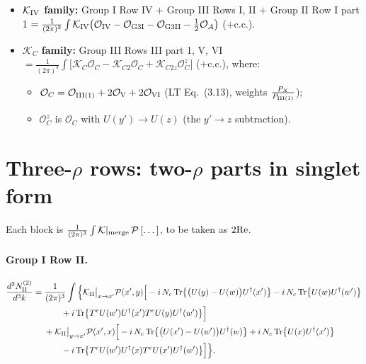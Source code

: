 \documentclass[10pt]{article}
\numberwithin{equation}{section}
\newcommand{\PP}{\mathcal P}
\newcommand{\Tr}{{\rm Tr}}
\newcommand{\Ud}{U^\dagger}
\newcommand{\OO}{\mathcal O}
\begin{document}
\begin{itemize}
\item \textbf{$\mathcal K_{\rm IV}$ family:} Group I Row IV $+$ Group III Rows I, II $+$ Group II Row I part 1 $=\frac{1}{(2\pi)^3}\int\mathcal K_{\rm IV}\big(\OO_{\rm IV}-\OO_{\rm G3I}-\OO_{\rm G3II}-\frac12\OO_{A}\big)$ ($+$c.c.).
\item \textbf{$\mathcal K_C$ family:} Group III Rows III part 1, V, VI $=\frac{1}{(2\pi)^3}\int\big[\mathcal K_C\OO_C-\mathcal K_{C2}\OO_C+\mathcal K_{C2z}\OO_C^{z}\big]$ ($+$c.c.), where:
\begin{itemize}
\item $\OO_C=\OO_{\rm III(1)}+2\OO_{\rm V}+2\OO_{\rm VI}$ (LT Eq.~(3.13), weights $\frac{P_X}{P_{\rm III(1)}}$);
\item $\OO_C^z$ is $\OO_C$ with $U(y')\to U(z)$ (the $y'\to z$ subtraction).
\end{itemize}
\end{itemize}

\section{Three-\texorpdfstring{$\rho$}{rho} rows: two-\texorpdfstring{$\rho$}{rho} parts in singlet form}\label{sec:three}
Each block is $\frac{1}{(2\pi)^3}\int\mathcal K|_{\rm merge}\,\PP\,[\dots]$, to be taken as $2{\rm Re}$.

\paragraph{Group I Row II.}
\begin{align}
\frac{d^3N^{(2)}_{\rm II}}{d^3k}={}&\frac{1}{(2\pi)^3}\int\Big\{\mathcal K_{\rm II}\big|_{x\to x'}\PP(x',y)\Big[-i\,N_c\,\Tr\big\{\big(U(y)-U(w)\big)\Ud(x')\big\}-i\,N_c\,\Tr\big\{U(w)\Ud(w')\big\}\notag\\&\qquad+i\,\Tr\big\{T^eU(w')\Ud(x')T^eU(y)\Ud(w')\big\}\Big]\notag\\
&+\mathcal K_{\rm II}\big|_{y\to x'}\PP(x',x)\Big[-i\,N_c\,\Tr\big\{\big(U(x')-U(w')\big)\Ud(w)\big\}+i\,N_c\,\Tr\big\{U(x)\Ud(x')\big\}\notag\\&\qquad-i\,\Tr\big\{T^eU(w')\Ud(x)T^eU(x')\Ud(w')\big\}\Big]\Big\}.
\end{align}
\end{document}
